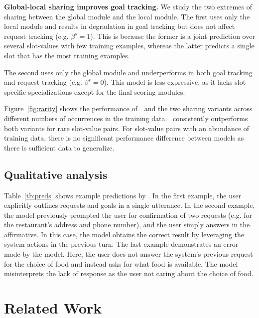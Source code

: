 \documentclass[11pt,a4paper]{article}
\begin{document}
\textbf{Global-local sharing improves goal tracking.}
We study the two extremes of sharing between the global module and the local module.
The first uses only the local module and results in degradation in goal tracking but does not affect request tracking (e.g. $\beta^s = 1$).
This is because the former is a joint prediction over several slot-values with few training examples, whereas the latter predicts a single slot that has the most training examples.

The second uses only the global module and underperforms in both goal tracking and request tracking (e.g. $\beta^s = 0$).
This model is less expressive, as it lacks slot-specific specializations except for the final scoring modules.

Figure~\ref{fig:rarity} shows the performance of~\modelnameshort~and the two sharing variants across different numbers of occurrences in the training data.
\modelnameshort~consistently outperforms both variants for rare slot-value pairs.
For slot-value pairs with an abundance of training data, there is no significant performance difference between models as there is sufficient data to generalize.



\subsection{Qualitative analysis}


Table~\ref{tb:preds} shows example predictions by \modelnameshort.
In the first example, the user explicitly outlines requests and goals in a single utterance.
In the second example, the model previously prompted the user for confirmation of two requests (e.g. for the restaurant's address and phone number), and the user simply answers in the affirmative.
In this case, the model obtains the correct result by leveraging the system actions in the previous turn.
The last example demonstrates an error made by the model.
Here, the user does not answer the system's previous request for the choice of food and instead asks for what food is available.
The model misinterprets the lack of response as the user not caring about the choice of food.














\section{Related Work}
\end{document}
